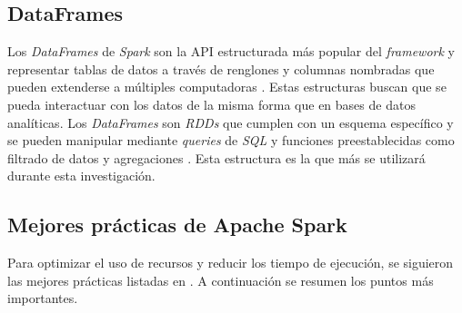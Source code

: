 \subsection{DataFrames}

Los \textit{DataFrames} de \textit{Spark} son la API estructurada más popular del \textit{framework} y representar tablas de datos a través de renglones y columnas nombradas que pueden extenderse a múltiples computadoras \cite{sparkguide}. Estas estructuras buscan que se pueda interactuar con los datos de la misma forma que en bases de datos analíticas. Los \textit{DataFrames} son \textit{RDDs} que cumplen con un esquema específico \cite{sparkberkeley} y se pueden manipular mediante \textit{queries} de \textit{SQL} y funciones preestablecidas como filtrado de datos y agregaciones \cite{sparkberkeley}. Esta estructura es la que más se utilizará durante esta investigación.

\subsection{Mejores prácticas de Apache Spark}

Para optimizar el uso de recursos y reducir los tiempo de ejecución, se siguieron las mejores prácticas listadas en \cite{sparkibm}. A continuación se resumen los puntos más importantes.


